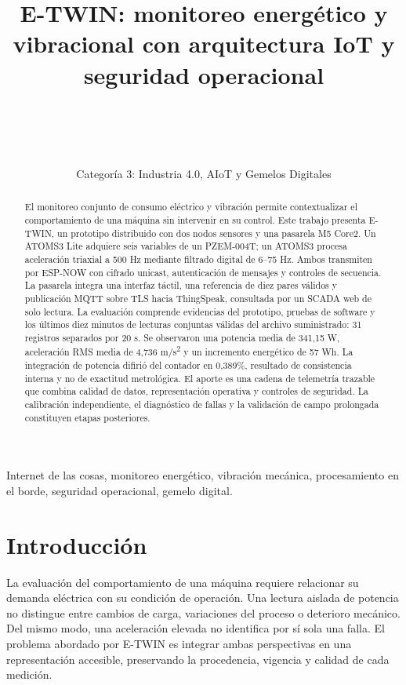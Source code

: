 \documentclass[journal,onecolumn,11pt,a4paper]{IEEEtran}
\begin{document}
\title{E-TWIN: monitoreo energético y vibracional con arquitectura IoT y seguridad operacional}
\author{\Autores\\[0.4em]
\normalsize\Afiliacion\\
\normalsize\Correos\\
\normalsize\Tutor\\[0.3em]
\normalsize Categoría 3: Industria 4.0, AIoT y Gemelos Digitales}
\maketitle
\begin{abstract}
El monitoreo conjunto de consumo eléctrico y vibración permite contextualizar el comportamiento de una máquina sin intervenir en su control. Este trabajo presenta E-TWIN, un prototipo distribuido con dos nodos sensores y una pasarela M5 Core2. Un ATOMS3 Lite adquiere seis variables de un PZEM-004T; un ATOMS3 procesa aceleración triaxial a 500 Hz mediante filtrado digital de 6--75 Hz. Ambos transmiten por ESP-NOW con cifrado unicast, autenticación de mensajes y controles de secuencia. La pasarela integra una interfaz táctil, una referencia de diez pares válidos y publicación MQTT sobre TLS hacia ThingSpeak, consultada por un SCADA web de solo lectura. La evaluación comprende evidencias del prototipo, pruebas de software y los últimos diez minutos de lecturas conjuntas válidas del archivo suministrado: 31 registros separados por 20 s. Se observaron una potencia media de 341,15 W, aceleración RMS media de 4,736 m/s\textsuperscript{2} y un incremento energético de 57 Wh. La integración de potencia difirió del contador en 0,389\%, resultado de consistencia interna y no de exactitud metrológica. El aporte es una cadena de telemetría trazable que combina calidad de datos, representación operativa y controles de seguridad. La calibración independiente, el diagnóstico de fallas y la validación de campo prolongada constituyen etapas posteriores.
\end{abstract}
\begin{IEEEkeywords}
Internet de las cosas, monitoreo energético, vibración mecánica, procesamiento en el borde, seguridad operacional, gemelo digital.
\end{IEEEkeywords}

\section{Introducción}
La evaluación del comportamiento de una máquina requiere relacionar su demanda eléctrica con su condición de operación. Una lectura aislada de potencia no distingue entre cambios de carga, variaciones del proceso o deterioro mecánico. Del mismo modo, una aceleración elevada no identifica por sí sola una falla. El problema abordado por E-TWIN es integrar ambas perspectivas en una representación accesible, preservando la procedencia, vigencia y calidad de cada medición.
\end{document}
